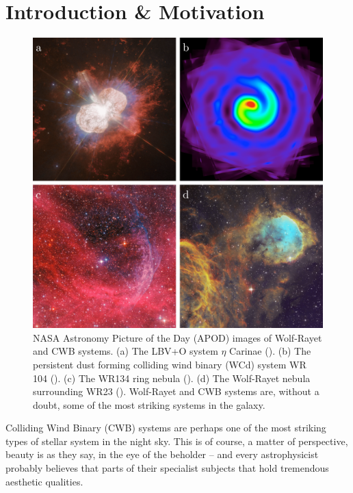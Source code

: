 \chapter{Introduction \& Motivation}

\begin{figure}[H]
  \centering
  \includegraphics[width=5in]{assets/wolf-rayets/wolf-rayets.png}
  \caption[NASA APOD images of Wolf-Rayet and CWB systems]{NASA Astronomy Picture of the Day (APOD) images of Wolf-Rayet and CWB systems. (a) The LBV+O system $\eta$ Carinae (). (b) The persistent dust forming colliding wind binary (WCd) system WR 104 (). (c) The WR134 ring nebula (). (d) The Wolf-Rayet nebula surrounding WR23 (). Wolf-Rayet and CWB systems are, without a doubt, some of the most striking systems in the galaxy.}
  \label{fig:cwbexamples}
\end{figure}

Colliding Wind Binary (CWB) systems are perhaps one of the most striking types of stellar system in the night sky.
This is of course, a matter of perspective, beauty is as they say, in the eye of the beholder -- and every astrophysicist probably believes that parts of their specialist subjects that hold tremendous aesthetic qualities.

